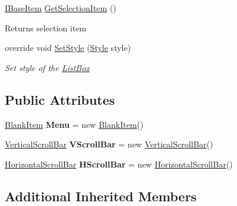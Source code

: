 \begin{DoxyCompactItemize}
\mbox{\hyperlink{interface_space_v_i_l_1_1_core_1_1_i_base_item}{I\+Base\+Item}} \mbox{\hyperlink{class_space_v_i_l_1_1_list_box_a40a4048d563693bb7d7dae2fe73e9150}{Get\+Selection\+Item}} ()
\begin{DoxyCompactList}\small\item\em \begin{DoxyReturn}{Returns}
selection item 
\end{DoxyReturn}
\end{DoxyCompactList}\item 
override void \mbox{\hyperlink{class_space_v_i_l_1_1_list_box_aee5cd595b70e4ca4dff5022c662373d9}{Set\+Style}} (\mbox{\hyperlink{class_space_v_i_l_1_1_decorations_1_1_style}{Style}} style)
\begin{DoxyCompactList}\small\item\em Set style of the \mbox{\hyperlink{class_space_v_i_l_1_1_list_box}{List\+Box}} \end{DoxyCompactList}\end{DoxyCompactItemize}
\subsection*{Public Attributes}
\begin{DoxyCompactItemize}
\item 
\mbox{\label{class_space_v_i_l_1_1_list_box_a79ceabb0fffccd3e130a2f4c8886d897}} 
\mbox{\hyperlink{class_space_v_i_l_1_1_blank_item}{Blank\+Item}} {\bfseries Menu} = new \mbox{\hyperlink{class_space_v_i_l_1_1_blank_item}{Blank\+Item}}()
\item 
\mbox{\label{class_space_v_i_l_1_1_list_box_ab491281cd3ad0e14c461ab5283d064ed}} 
\mbox{\hyperlink{class_space_v_i_l_1_1_vertical_scroll_bar}{Vertical\+Scroll\+Bar}} {\bfseries V\+Scroll\+Bar} = new \mbox{\hyperlink{class_space_v_i_l_1_1_vertical_scroll_bar}{Vertical\+Scroll\+Bar}}()
\item 
\mbox{\label{class_space_v_i_l_1_1_list_box_a70fa5b14efbfbffeace65ef4899bd24a}} 
\mbox{\hyperlink{class_space_v_i_l_1_1_horizontal_scroll_bar}{Horizontal\+Scroll\+Bar}} {\bfseries H\+Scroll\+Bar} = new \mbox{\hyperlink{class_space_v_i_l_1_1_horizontal_scroll_bar}{Horizontal\+Scroll\+Bar}}()
\end{DoxyCompactItemize}
\subsection*{Additional Inherited Members}


